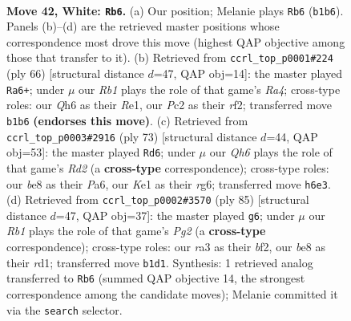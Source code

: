 \documentclass[11pt]{article}
\begin{document}
\clearpage

\begin{figure}[p]\centering
\begin{subfigure}{0.46\textwidth}\centering
\resizebox{\linewidth}{!}{%
\newchessgame
\chessboard[
  setfen={4b3/5k2/5n1Q/3P4/8/r5p1/P1P1p1P1/1R2K3 w - - 0 42},
  showmover=false,
  pgfstyle=straightmove, color=movearrow, markmove={b1-b6}
]}
\caption{}
\end{subfigure}\hfill
\begin{subfigure}{0.46\textwidth}\centering
\resizebox{\linewidth}{!}{%
\newchessgame
\chessboard[
  setfen={8/4b3/5k2/5np1/R7/2P3PK/P4r2/4R3 w - - 0 34},
  showmover=false,
  pgfstyle=straightmove, color=movearrow, markmove={a4-a6}
]}
\caption{}
\end{subfigure}
\\[4pt]
\begin{subfigure}{0.46\textwidth}\centering
\resizebox{\linewidth}{!}{%
\newchessgame
\chessboard[
  setfen={5k2/1p1r4/p5Rp/P2B4/1b2KP2/7P/8/8 b - - 8 37},
  showmover=false,
  pgfstyle=straightmove, color=movearrow, markmove={d7-d6}
]}
\caption{}
\end{subfigure}\hfill
\begin{subfigure}{0.46\textwidth}\centering
\resizebox{\linewidth}{!}{%
\newchessgame
\chessboard[
  setfen={8/6pk/8/4pp2/7p/q3N2P/5BP1/3R2K1 b - - 1 43},
  showmover=false,
  pgfstyle=straightmove, color=movearrow, markmove={g7-g6}
]}
\caption{}
\end{subfigure}
\caption{\textbf{Move 42, White: \texttt{Rb6}.} (a) Our position; Melanie plays \texttt{Rb6} (\texttt{b1b6}). Panels (b)--(d) are the retrieved master positions whose correspondence most drove this move (highest QAP objective among those that transfer to it). (b) Retrieved from \texttt{ccrl\_top\_p0001\#224} (ply 66) [structural distance $d$=47, QAP obj=14]: the master played \texttt{Ra6+}; under $\mu$ our \emph{Rb1} plays the role of that game's \emph{Ra4}; cross-type roles: our \emph{Q}h6 as their \emph{R}e1, our \emph{P}c2 as their \emph{r}f2; transferred move \texttt{b1b6} \textbf{(endorses this move)}. (c) Retrieved from \texttt{ccrl\_top\_p0003\#2916} (ply 73) [structural distance $d$=44, QAP obj=53]: the master played \texttt{Rd6}; under $\mu$ our \emph{Qh6} plays the role of that game's \emph{Rd2} (a \textbf{cross-type} correspondence); cross-type roles: our \emph{b}e8 as their \emph{P}a6, our \emph{K}e1 as their \emph{r}g6; transferred move \texttt{h6e3}. (d) Retrieved from \texttt{ccrl\_top\_p0002\#3570} (ply 85) [structural distance $d$=47, QAP obj=37]: the master played \texttt{g6}; under $\mu$ our \emph{Rb1} plays the role of that game's \emph{Pg2} (a \textbf{cross-type} correspondence); cross-type roles: our \emph{r}a3 as their \emph{b}f2, our \emph{b}e8 as their \emph{r}d1; transferred move \texttt{b1d1}. Synthesis: 1 retrieved analog transferred to \texttt{Rb6} (summed QAP objective 14, the strongest correspondence among the candidate moves); Melanie committed it via the \texttt{search} selector.}
\label{fig:thought-m82}
\end{figure}
\end{document}
